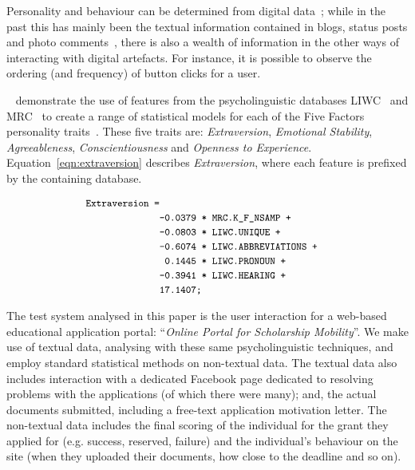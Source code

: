 \documentclass[letterpaper]{article}
\begin{document}
Personality and behaviour can be determined from digital
data~\cite{pennebaker-et-al:2001,vazire+gosling:2004,iacobelli-et-al:2011,oatley+crick:2014};
while in the past this has mainly been the textual information
contained in blogs, status posts and photo
comments~\cite{blamey-et-al-2012,blamey-et-al-2013}, there is also a
wealth of information in the other ways of interacting with digital
artefacts. For instance, it is possible to observe the ordering (and
frequency) of button clicks for a user.

\citeauthor{mairesse-et-al:2007}~
demonstrate the use of features from the psycholinguistic databases
LIWC~\cite{pennebaker-et-al:2001} and MRC~\cite{wilson:1988} to create
a range of statistical models for each of the Five Factors personality
traits~\cite{norman:1963,peabody+goldberg:1989,goldberg:1990}. These
five traits are: {\emph{Extraversion}}, {\emph{Emotional Stability}},
{\emph{Agreeableness}}, {\emph{Conscientiousness}} and {\emph{Openness
to Experience}}. Equation~\ref{eqn:extraversion} describes
{\emph{Extraversion}}, where each feature is prefixed by the
containing database.

\begin{equation}\label{eqn:extraversion}
\small
\begin{aligned}
\verb!Extraversion =!\\
&\verb!-0.0379 * MRC.K_F_NSAMP +!\\
&\verb!-0.0803 * LIWC.UNIQUE +!\\
&\verb!-0.6074 * LIWC.ABBREVIATIONS +!\\
&\verb! 0.1445 * LIWC.PRONOUN +!\\
&\verb!-0.3941 * LIWC.HEARING +!\\  
&\verb!17.1407;!
\end{aligned}
\end{equation}

The test system analysed in this paper is the user interaction for a
web-based educational application portal: ``{\emph{Online Portal for
Scholarship Mobility}}''. We make use of textual data, analysing with
these same psycholinguistic techniques, and employ standard
statistical methods on non-textual data. The textual data also
includes interaction with a dedicated Facebook page dedicated to
resolving problems with the applications (of which there were many);
and, the actual documents submitted, including a free-text application
motivation letter. The non-textual data includes the final scoring of
the individual for the grant they applied for (e.g. success, reserved,
failure) and the individual's behaviour on the site (when they uploaded
their documents, how close to the deadline and so on).
\end{document}
